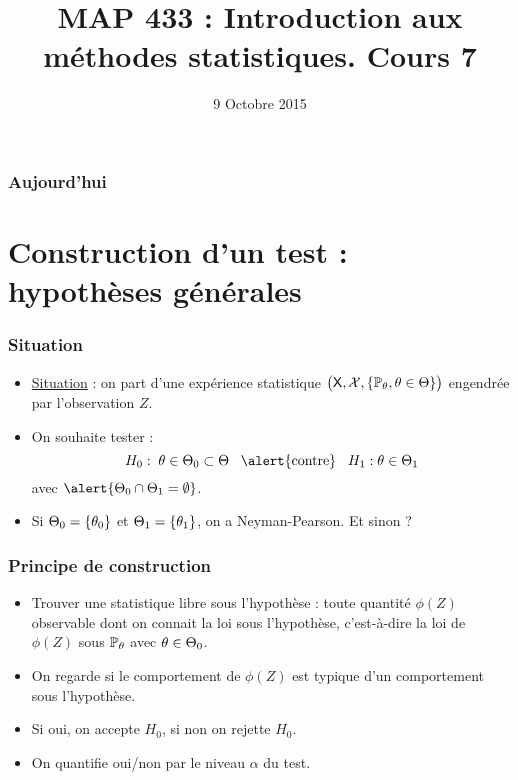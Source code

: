 



\title{MAP 433 : Introduction aux méthodes statistiques. Cours 7}

\date{9 Octobre 2015}
\maketitle



\begin{frame}
\frametitle{Aujourd'hui}
\tableofcontents
\end{frame}






\section{Construction d'un test : hypothèses générales}



\begin{frame}
\frametitle{Situation}
\begin{itemize}
\item \underline{Situation} : on part d'une expérience statistique $\big(\mathsf{X}, \mathcal{X},\{\operatorname{{\mathbb P}}_\theta, \theta \in \Theta\}\big)$ engendrée par l'observation $Z$.
\item On souhaite tester :
$$H_0:\;\truetheta \in \Theta_0 \subset \Theta\;\;\;\text{\alert{contre}}\;\;\;H_1:\truetheta \in \Theta_1$$
avec $\alert{\Theta_0 \cap \Theta_1 = \emptyset}$.
\item Si $\Theta_0 = \{\theta_0\}$ et $\Theta_1 = \{\theta_1\}$, on a Neyman-Pearson. \alert{ Et sinon ?}
\end{itemize}
\end{frame}

\begin{frame}
\frametitle{Principe de construction}
\begin{itemize}
\item  Trouver  une \alert{statistique libre sous l'hypothèse} : toute quantité $\phi(Z)$ \alert{observable} dont on connait la loi sous l'hypothèse, c'est-à-dire la loi de $\phi(Z)$ sous $\operatorname{{\mathbb P}}_\theta$ avec $\theta \in \Theta_0$.
\item On  regarde  si le comportement de $\phi(Z)$ est \alert{typique} d'un comportement sous l'hypothèse.
\item Si oui, on \alert{accepte} $H_0$, si non on \alert{rejette} $H_0$.
\item On quantifie  oui/non  par le niveau $\alpha$ du test.
\end{itemize}
\end{frame}

